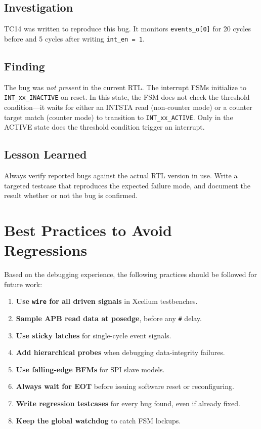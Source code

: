 \subsection{Investigation}

TC14 was written to reproduce this bug. It monitors \texttt{events\_o[0]} for 20 cycles before
and 5 cycles after writing \texttt{int\_en = 1}.

\subsection{Finding}

The bug was \emph{not present} in the current RTL. The interrupt FSMs initialize to
\texttt{INT\_xx\_INACTIVE} on reset. In this state, the FSM does not check the threshold
condition---it waits for either an INTSTA read (non-counter mode) or a counter target match
(counter mode) to transition to \texttt{INT\_xx\_ACTIVE}. Only in the ACTIVE state does
the threshold condition trigger an interrupt.

\subsection{Lesson Learned}

Always verify reported bugs against the actual RTL version in use. Write a targeted testcase
that reproduces the expected failure mode, and document the result whether or not the bug
is confirmed.

\section{Best Practices to Avoid Regressions}

Based on the debugging experience, the following practices should be followed for future work:

\begin{enumerate}[leftmargin=2em]
  \item \textbf{Use \texttt{wire} for all driven signals} in Xcelium testbenches.
  \item \textbf{Sample APB read data at posedge}, before any \texttt{\#} delay.
  \item \textbf{Use sticky latches} for single-cycle event signals.
  \item \textbf{Add hierarchical probes} when debugging data-integrity failures.
  \item \textbf{Use falling-edge BFMs} for SPI slave models.
  \item \textbf{Always wait for EOT} before issuing software reset or reconfiguring.
  \item \textbf{Write regression testcases} for every bug found, even if already fixed.
  \item \textbf{Keep the global watchdog} to catch FSM lockups.
\end{enumerate}
